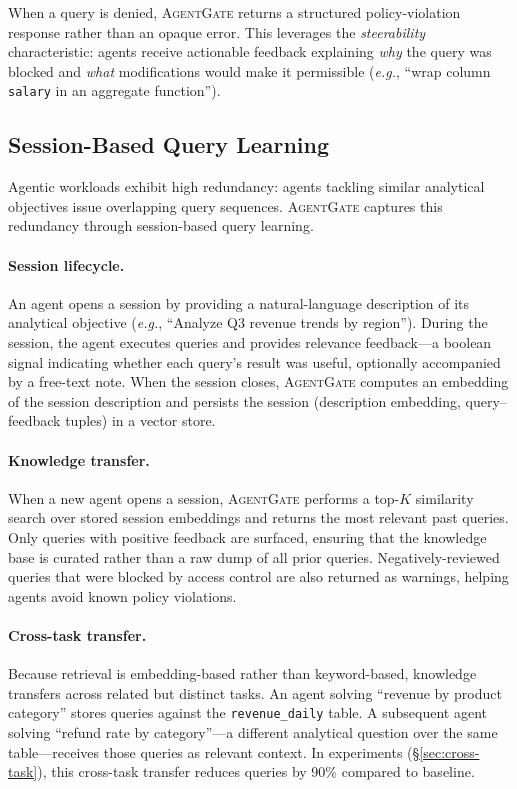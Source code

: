 \documentclass[sigconf, nonacm]{acmart}
\newcommand{\sysname}{\textsc{AgentGate}\xspace}  %
\newcommand{\eg}{\textit{e.g.}\xspace}
\begin{document}
When a query is denied, \sysname returns a structured policy-violation response
rather than an opaque error. This leverages the \emph{steerability}
characteristic: agents receive actionable feedback explaining \emph{why} the
query was blocked and \emph{what} modifications would make it permissible (\eg,
``wrap column \texttt{salary} in an aggregate function'').

\subsection{Session-Based Query Learning}
\label{sec:learning}

Agentic workloads exhibit high redundancy: agents tackling similar analytical
objectives issue overlapping query sequences.  \sysname captures this
redundancy through session-based query learning.

\paragraph{Session lifecycle.}
An agent opens a session by providing a natural-language description of its
analytical objective (\eg, ``Analyze Q3 revenue trends by region'').  During
the session, the agent executes queries and provides relevance feedback---a
boolean signal indicating whether each query's result was useful, optionally
accompanied by a free-text note.  When the session closes, \sysname computes
an embedding of the session description and persists the session (description
embedding, query--feedback tuples) in a vector store.

\paragraph{Knowledge transfer.}
When a new agent opens a session, \sysname performs a top-$K$ similarity
search over stored session embeddings and returns the most relevant past
queries.  Only queries with positive feedback are surfaced, ensuring that
the knowledge base is curated rather than a raw dump of all prior queries.
Negatively-reviewed queries that were blocked by access control are also
returned as warnings, helping agents avoid known policy violations.

\paragraph{Cross-task transfer.}
Because retrieval is embedding-based rather than keyword-based, knowledge
transfers across related but distinct tasks.  An agent solving
``revenue by product category'' stores queries against the \texttt{revenue\_daily}
table.  A subsequent agent solving ``refund rate by category''---a different
analytical question over the same table---receives those queries as relevant
context.  In experiments (\S\ref{sec:cross-task}), this cross-task transfer
reduces queries by 90\% compared to baseline.
\end{document}

